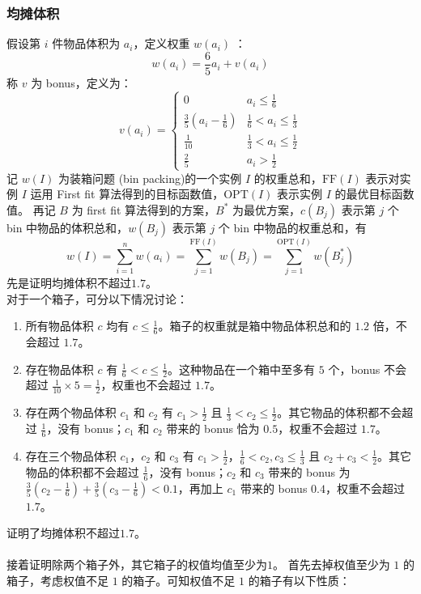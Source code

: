 \subsubsection{均摊体积}
假设第 $i$ 件物品体积为 $a_i$，定义权重 $w(a_i)$ ：
$$
w(a_i) = \frac{6}{5}a_i + v(a_i)
$$
称 $v$ 为 bonus，定义为：
$$
v(a_i) = \begin{cases} 0 & a_i \le \frac{1}{6} \\ \frac{3}{5}(a_i - \frac{1}{6}) & \frac{1}{6} < a_i \le \frac{1}{3} \\ \frac{1}{10} & \frac{1}{3} < a_i \le \frac{1}{2} \\ \frac{2}{5} & a_i > \frac{1}{2} \end{cases}
$$
记 $w(I)$ 为装箱问题 (bin packing)的一个实例 $I$ 的权重总和，$\text{FF}(I)$ 表示对实例 $I$ 运用 First fit 算法得到的目标函数值，$\text{OPT}(I)$ 表示实例 $I$ 的最优目标函数值。
再记 $B$ 为 first fit 算法得到的方案，$B^*$ 为最优方案，$c(B_j)$ 表示第 $j$ 个 bin 中物品的体积总和，$w(B_j)$ 表示第 $j$ 个 bin 中物品的权重总和，有
$$
w(I) = \sum\limits_{i=1}^n w(a_i) = \sum\limits_{j=1}^{\text{FF}(I)}w(B_j) = \sum\limits_{j=1}^{\text{OPT}(I)}w(B^*_j)
$$
先是证明均摊体积不超过$1.7$。 \\
对于一个箱子，可分以下情况讨论：
\begin{enumerate}
    \item 所有物品体积 $c$ 均有 $c \le \frac{1}{6}$。箱子的权重就是箱中物品体积总和的 $1.2$ 倍，不会超过 $1.7$。
    \item 存在物品体积 $c$ 有 $\frac{1}{6} < c \le \frac{1}{2}$。这种物品在一个箱中至多有 $5$ 个，bonus 不会超过 $\frac{1}{10} \times 5 = \frac{1}{2}$，权重也不会超过 $1.7$。
    \item 存在两个物品体积 $c_1$ 和 $c_2$ 有 $c_1 > \frac{1}{2}$ 且 $\frac{1}{3} < c_2 \le \frac{1}{2}$。其它物品的体积都不会超过 $\frac{1}{6}$，没有 bonus；$c_1$ 和 $c_2$ 带来的 bonus 恰为 $0.5$，权重不会超过 $1.7$。
    \item 存在三个物品体积 $c_1$，$c_2$ 和 $c_3$ 有 $c_1 > \frac{1}{2}$，$\frac{1}{6} < c_2, c_3 \le \frac{1}{3}$ 且 $c_2 + c_3 < \frac{1}{2}$。其它物品的体积都不会超过 $\frac{1}{6}$，没有 bonus；$c_2$ 和 $c_3$ 带来的 bonus 为 $\frac{3}{5}(c_2 - \frac{1}{6}) + \frac{3}{5}(c_3 - \frac{1}{6}) < 0.1$，再加上 $c_1$ 带来的 bonus $0.4$，权重不会超过 $1.7$。
\end{enumerate}
证明了均摊体积不超过$1.7$。 \\~\\
接着证明除两个箱子外，其它箱子的权值均值至少为$1$。
首先去掉权值至少为 $1$ 的箱子，考虑权值不足 $1$ 的箱子。可知权值不足 $1$ 的箱子有以下性质：
